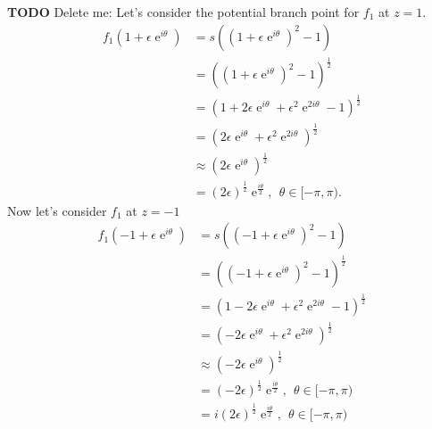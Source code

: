 \documentclass[10pt]{amsart}
\DeclareMathOperator{\E}{e}
\theoremstyle{nonumberplain}
\begin{document}
\textbf{TODO} Delete me:
Let's consider the potential branch point for $f_1$ at $z=1$.
\begin{align*}
f_1(1 + \epsilon \E^{i \theta}) &= s\left(\left(1 + \epsilon \E^{i \theta} \right)^2 - 1\right) \\
					    &= \left(\left(1 + \epsilon \E^{i \theta} \right)^2  - 1 \right)^{\frac{1}{2}} \\
					    &= \left(1 + 2 \epsilon \E^{i \theta} + \epsilon^2\E^{2 i \theta}  - 1 \right)^{\frac{1}{2}} \\
					    &= \left(2 \epsilon \E^{i \theta} + \epsilon^2\E^{2 i \theta}\right)^{\frac{1}{2}} \\	
					    &\approx \left(2 \epsilon \E^{i \theta}\right)^{\frac{1}{2}} \\
					    &= \left(2 \epsilon\right)^{\frac{1}{2}} \E^{\frac{i \theta}{2}}, \:\: \theta \in [-\pi, \pi).
\end{align*}
Now let's consider $f_1$ at $z=-1$
\begin{align*}
f_1(-1 + \epsilon \E^{i \theta}) &= s\left(\left(-1 + \epsilon \E^{i \theta} \right)^2 - 1\right) \\
					    &= \left(\left(-1 + \epsilon \E^{i \theta} \right)^2  - 1 \right)^{\frac{1}{2}} \\
					    &= \left(1 - 2 \epsilon \E^{i \theta} + \epsilon^2\E^{2 i \theta}  - 1 \right)^{\frac{1}{2}} \\
					    &= \left(- 2 \epsilon \E^{i \theta} + \epsilon^2\E^{2 i \theta}\right)^{\frac{1}{2}} \\	
					    &\approx \left(-2 \epsilon \E^{i \theta}\right)^{\frac{1}{2}} \\
					    &= \left(-2 \epsilon\right)^{\frac{1}{2}} \E^{\frac{i \theta}{2}}, \:\: \theta \in [-\pi, \pi) \\
					    &= i \left(2 \epsilon\right)^{\frac{1}{2}} \E^{\frac{i \theta}{2}}, \:\: \theta \in [-\pi, \pi) \\
\end{align*}
\end{document}
